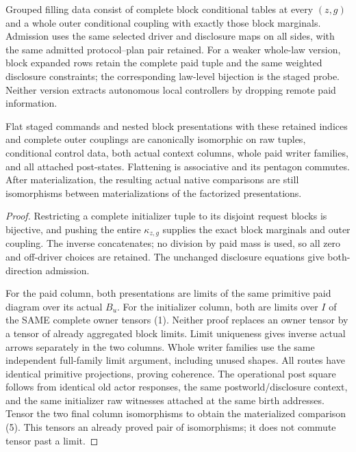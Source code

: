\documentclass[11pt]{article}
\begin{document}
Grouped filling data consist of complete block conditional tables at every $(z,g)$ and a whole outer conditional coupling with exactly those block marginals. Admission uses the same selected driver and disclosure maps on all sides, with the same admitted protocol--plan pair retained. For a weaker whole-law version, block expanded rows retain the complete paid tuple and the same weighted disclosure constraints; the corresponding law-level bijection is the staged probe. Neither version extracts autonomous local controllers by dropping remote paid information.

\begin{theorem}
Flat staged commands and nested block presentations with these retained indices and complete outer couplings are canonically isomorphic on raw tuples, conditional control data, both actual context columns, whole paid writer families, and all attached post-states. Flattening is associative and its pentagon commutes. After materialization, the resulting actual native comparisons are still isomorphisms between materializations of the factorized presentations.
\end{theorem}
\begin{proof}
Restricting a complete initializer tuple to its disjoint request blocks is bijective, and pushing the entire $\kappa_{z,g}$ supplies the exact block marginals and outer coupling. The inverse concatenates; no division by paid mass is used, so all zero and off-driver choices are retained. The unchanged disclosure equations give both-direction admission.

For the paid column, both presentations are limits of the same primitive paid diagram over its actual $B_u$. For the initializer column, both are limits over $I$ of the SAME complete owner tensors (1). Neither proof replaces an owner tensor by a tensor of already aggregated block limits. Limit uniqueness gives inverse actual arrows separately in the two columns. Whole writer families use the same independent full-family limit argument, including unused shapes. All routes have identical primitive projections, proving coherence. The operational post square follows from identical old actor responses, the same postworld/disclosure context, and the same initializer raw witnesses attached at the same birth addresses. Tensor the two final column isomorphisms to obtain the materialized comparison (5). This tensors an already proved pair of isomorphisms; it does not commute tensor past a limit.\end{proof}
\end{document}
